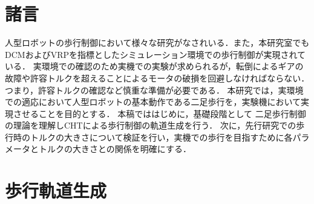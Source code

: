 \documentclass[twocolumn]{jsarticle}
\date{2019年05月30日}
\begin{document}
\mtitle



% 
\section{諸言}
人型ロボットの歩行制御において様々な研究がなされいる．また，本研究室でもDCMおよびVRPを指標としたシミュレーション環境での歩行制御が実現されている．
実環境での確認のため実機での実験が求められるが，転倒によるギアの故障や許容トルクを超えることによるモータの破損を回避しなければならない．
つまり，許容トルクの確認など慎重な準備が必要である．
本研究では，実環境での適応において人型ロボットの基本動作である二足歩行を，実験機において実現させることを目的とする．
本稿でははじめに，基礎段階として%
二足歩行制御の理論を理解しCHTによる歩行制御の軌道生成を行う．
次に，先行研究での歩行時のトルクの大きさについて検証を行い，実機での歩行を目指すために各パラメータとトルクの大きさとの関係を明確にする．
\section{歩行軌道生成}
\end{document}
